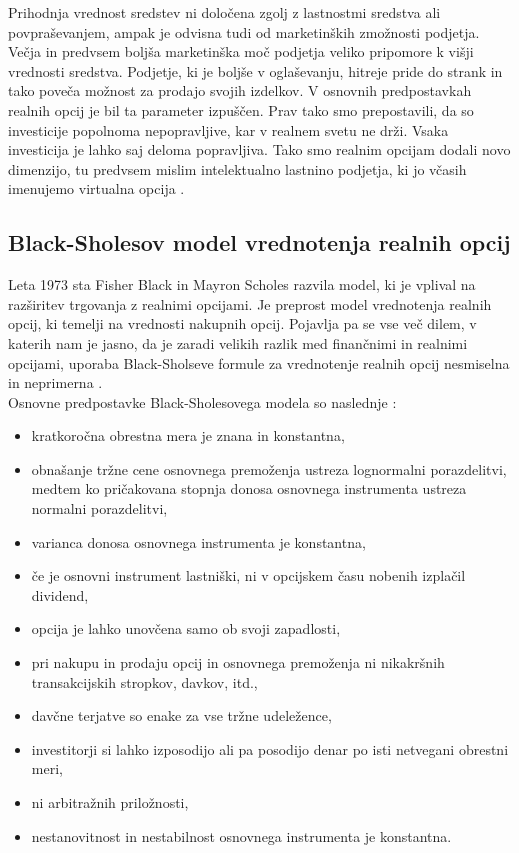 \documentclass[12pt, a4paper]{amsart}
\theoremstyle{definition} %
\theoremstyle{plain} %
\begin{document}
Prihodnja vrednost sredstev ni določena zgolj z lastnostmi sredstva ali povpraševanjem, ampak je odvisna tudi od marketinških zmožnosti podjetja. Večja in predvsem boljša marketinška moč podjetja veliko pripomore k višji vrednosti sredstva. Podjetje, ki je boljše v oglaševanju, hitreje pride do strank in tako poveča možnost za prodajo svojih izdelkov. V osnovnih predpostavkah realnih opcij je bil ta parameter izpuščen. Prav tako smo prepostavili, da so investicije popolnoma nepopravljive, kar v realnem svetu ne drži. Vsaka investicija je lahko saj deloma popravljiva. Tako smo realnim opcijam dodali novo dimenzijo, tu predvsem mislim intelektualno lastnino podjetja, ki jo včasih imenujemo virtualna opcija \cite[str. 43]{Brach}.  \\

\subsection{Black-Sholesov model vrednotenja realnih opcij}
Leta 1973 sta Fisher Black in Mayron Scholes razvila model, ki je vplival na razširitev trgovanja z realnimi opcijami. Je preprost model vrednotenja realnih opcij, ki temelji na vrednosti nakupnih opcij. Pojavlja pa se vse več dilem, v katerih nam je jasno, da je zaradi velikih razlik med finančnimi in realnimi opcijami, uporaba Black-Sholseve formule za vrednotenje realnih opcij nesmiselna in neprimerna \cite[str. 48]{Brach}. \\

Osnovne predpostavke Black-Sholesovega modela so naslednje \cite[str. 19]{Mohar}:
\begin{itemize}
\item kratkoročna obrestna mera je znana in konstantna,
\item obnašanje tržne cene osnovnega premoženja ustreza lognormalni porazdelitvi, medtem ko pričakovana stopnja donosa osnovnega instrumenta ustreza normalni porazdelitvi,
\item varianca donosa osnovnega instrumenta je konstantna,
\item če je osnovni instrument lastniški, ni v opcijskem času nobenih izplačil dividend,
\item opcija je lahko unovčena samo ob svoji zapadlosti,
\item pri nakupu in prodaju opcij in osnovnega premoženja ni nikakršnih transakcijskih stropkov, davkov, itd.,
\item davčne terjatve so enake za vse tržne udeležence,
\item investitorji si lahko izposodijo ali pa posodijo denar po isti netvegani obrestni meri,
\item ni arbitražnih priložnosti,
\item nestanovitnost in nestabilnost osnovnega instrumenta je konstantna.
\end{itemize}
\end{document}
